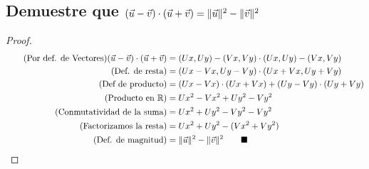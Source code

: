 \documentclass[14pt]{extarticle}
\DeclarePairedDelimiter\norm{\lVert}{\rVert}%
\begin{document}
    \subsection{Demuestre que $(\vec{u}-\vec{v})\cdot(\vec{u}+\vec{v}) = \norm{\vec{u}}^2-\norm{\vec{v}}^2$}
        \begin{proof}
        \begin{align}
            \tag{Por def. de Vectores} (\vec{u}-\vec{v})\cdot(\vec{u}+\vec{v}) &= (Ux,Uy)-(Vx,Vy) \cdot (Ux,Uy)-(Vx,Vy) \\
            \tag{Def. de resta} &= (Ux-Vx,Uy-Vy)\cdot (Ux+Vx,Uy+Vy) \\
            \tag{Def de producto} &= (Ux-Vx)\cdot (Ux+Vx)+(Uy-Vy)\cdot(Uy+Vy) \\
            \tag{Producto en $\mathbb{R}$} &= Ux^2-Vx^2+Uy^2-Vy^2 \\
            \tag{Conmutatividad de la suma} &= Ux^2 + Uy^2 - Vy^2 - Vy^2 \\
            \tag{Factorizamos la resta} &= Ux^2+Uy^2 - (Vx^2+Vy^2) \\
            \tag{Def. de magnitud} &= \norm{\vec{u}}^2 - \norm{\vec{v}}^2 \qquad \blacksquare
        \end{align}
        \end{proof}
\end{document}
